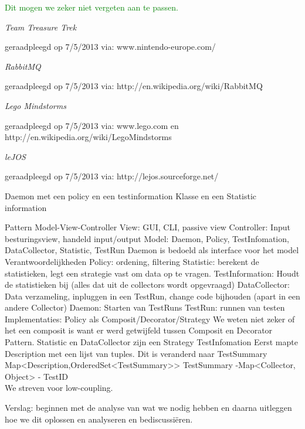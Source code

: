 \documentclass[i2]{oss}
\newcommand{\comment}[1]{{\huge \textcolor{green}{#1}}\\}
\begin{document}
\newpage
\comment{Dit mogen we zeker niet vergeten aan te passen.}
\begin{flushleft}
\begin{thebibliography}{9}

\textit{Team Treasure Trek}
\begin{scriptsize}
geraadpleegd op 7/5/2013 via: \mbox{www.nintendo-europe.com/}
\end{scriptsize}

\textit{RabbitMQ}
\begin{scriptsize}
geraadpleegd op 7/5/2013 via: \mbox{http://en.wikipedia.org/wiki/RabbitMQ}
\end{scriptsize}

\textit{Lego Mindstorms}
\begin{scriptsize}
geraadpleegd op 7/5/2013 via: \mbox{www.lego.com} en \mbox{http://en.wikipedia.org/wiki/Lego\textendash Mindstorms}
\end{scriptsize}

\textit{leJOS}
\begin{scriptsize}
geraadpleegd op 7/5/2013 via: \mbox{http://lejos.sourceforge.net/}
\end{scriptsize}


\end{thebibliography}
\end{flushleft}

Daemon met een policy en een testinformation Klasse en een Statistic information 

Pattern Model-View-Controller
View:  GUI, CLI, passive view
Controller:
Input besturingsview, handeld input/output
Model: Daemon, Policy, TestInfomation, DataCollector, Statistic, TestRun
Daemon is bedoeld als interface voor het model
\\
Verantwoordelijkheden
Policy: ordening, filtering
Statistic: berekent de statistieken, legt een strategie vast om data op te vragen.
TestInformation:  Houdt de statistieken bij (alles dat uit de collectors wordt opgevraagd)
DataCollector: Data verzameling, inpluggen in een TestRun, change code bijhouden (apart in een andere Collector)
Daemon:  Starten van TestRuns
TestRun:  runnen van testen
\\
Implementaties:
Policy als Composit/Decorator/Strategy
We weten niet zeker of het een composit is want er werd getwijfeld tussen Composit en Decorator Pattern. 
Statistic en DataCollector zijn een Strategy
TestInfomation
Eerst mapte Description met een lijst van tuples. Dit is veranderd naar TestSummary
Map\textless Description,OrderedSet\textless TestSummary\textgreater \textgreater
	TestSummary	-Map\textless Collector, Object\textgreater
			- TestID \\
We streven voor low-coupling. 

Verslag: beginnen met de analyse van wat we nodig hebben en daarna uitleggen hoe we dit oplossen en analyseren en bediscussi\"eren.

 
\end{document}
